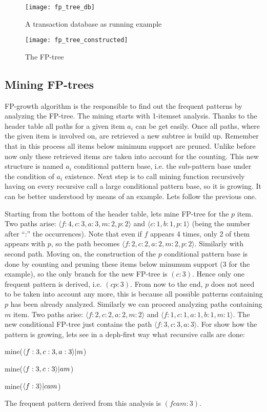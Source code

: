 \begin{figure}
  \centering
  \texttt{[image: fp\_tree\_db]}
  \caption{A transaction database as running example}
  \label{fig:fp_tree_db}
\end{figure}

\begin{figure}
  \centering
  \texttt{[image: fp\_tree\_constructed]}
  \caption{The FP-tree}
  \label{fig:fp_tree_constructed}
\end{figure}

\subsection{Mining FP-trees}

FP-growth algorithm is the responsible to find out the
frequent patterns by analyzing the FP-tree. The mining starts with 1-itemset
analysis. Thanks to the header table all paths for a given item $a_{i}$ can be get
easily. Once all paths, where the given item is involved on, are retrieved a new 
subtree is build up. Remember that in this process all items below minimum support 
are pruned. Unlike before now only these retrieved items are taken into account 
for the counting. This new structure is named $a_{i}$ conditional pattern base,
i.e. the sub-pattern base under the condition of $a_{i}$ existence. Next step is
to call mining function recursively having on every recursive call a large
conditional pattern base, so it is growing. It can be better understood by means
of an example. Lets follow the previous one.

Starting from the bottom of the header table, lets mine FP-tree for the $p$ item. Two
paths arise: $\langle f:4,c:3,a:3,m:2,p:2 \rangle$ and $\langle c:1, b:1, p:1
\rangle$ (being the number after ``:'' the occurrences). Note that even if $f$
appears 4 times, only 2 of them appears with $p$, so the path becomes $\langle 
f:2,c:2,a:2,m:2,p:2 \rangle$. Similarly with second path. Moving on, the
construction of the $p$ conditional pattern base is done by counting and pruning
these items below minumum support (3 for the example), so the only branch for the new FP-tree is
$(c:3)$. Hence only one frequent pattern is derived, i.e. $(cp:3)$. From now to
the end, $p$ does not need to be taken into account any more, this is because
all possible patterns containing $p$ has been already analyzed. Similarly we can proceed analyzing paths containing $m$ item. Two paths arise: 
$\langle f:2,c:2,a:2,m:2 \rangle$ and $\langle f:1,c:1,a:1,b:1,m:1 \rangle$. The
new conditional FP-tree just contains the path $\langle f:3,c:3,a:3 \rangle$.
For show how the pattern is growing, lets see in a deph-first way what
recursive calls are done:
\begin{enumerate*}[label=(\roman*)]
  \item mine($\langle f:3,c:3,a:3 \rangle \text{\textbar} m$)
  \item mine($\langle f:3,c:3 \rangle \text{\textbar} am$)
  \item mine($\langle f:3 \rangle \text{\textbar} cam$)
\end{enumerate*}
The frequent pattern derived from this analysis is $(fcam:3)$.


